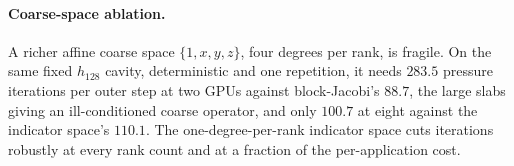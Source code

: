 \paragraph{Coarse-space ablation.}
A richer affine coarse space $\{1,x,y,z\}$, four degrees per rank, is fragile. On the same
fixed $h_{128}$ cavity, deterministic and one repetition, it needs $283.5$ pressure
iterations per outer step at two GPUs against block-Jacobi's $88.7$, the large slabs giving
an ill-conditioned coarse operator, and only $100.7$ at eight against the indicator space's
$110.1$. The one-degree-per-rank indicator space cuts iterations robustly at every rank
count and at a fraction of the per-application cost.
